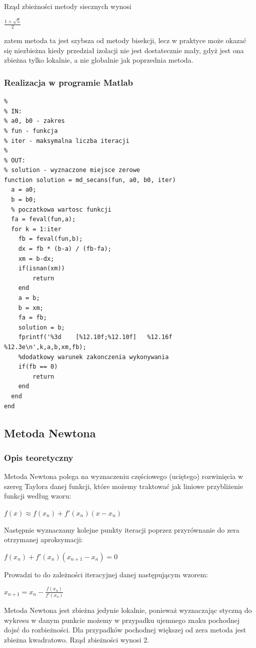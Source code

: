 \documentclass[11pt, oneside]{article}   	%
\begin{document}
Rząd zbieżności metody siecznych wynosi \begin{large}$\frac{1+\sqrt{5}}{2}$\end{large} zatem metoda ta jest szybsza od metody bisekcji, lecz w praktyce może okazać się niezbieżna kiedy przedział izolacji nie jest dostatecznie mały, gdyż jest ona zbieżna tylko lokalnie, a nie globalnie jak poprzednia metoda. 
\subsubsection{Realizacja w programie Matlab}
\begin{lstlisting}[caption=Implementacja metody siecznych]
% Funkcja wyznaczajaca punkty zerowe funkcji metoda siecznych
%
% IN:
% a0, b0 - zakres
% fun - funkcja 
% iter - maksymalna liczba iteracji
%
% OUT:
% solution - wyznaczone miejsce zerowe
function solution = md_secans(fun, a0, b0, iter)
  a = a0;
  b = b0;
  % poczatkowa wartosc funkcji
  fa = feval(fun,a); 
  for k = 1:iter
    fb = feval(fun,b);
    dx = fb * (b-a) / (fb-fa); 
    xm = b-dx; 
    if(isnan(xm))
        return
    end
    a = b;
    b = xm;
    fa = fb;
    solution = b;
    fprintf('%3d	[%12.10f;%12.10f]   %12.16f     %12.3e\n',k,a,b,xm,fb);
    %dodatkowy warunek zakonczenia wykonywania
    if(fb == 0) 
        return
    end
  end
end
\end{lstlisting}

\subsection{Metoda Newtona}
\subsubsection{Opis teoretyczny}
Metoda Newtona polega na wyznaczeniu częściowego (uciętego) rozwinięcia w szereg Taylora danej funkcji, które możemy traktować jak liniowe przybliżenie funkcji według wzoru:\
  	\begin{center}
  	$f(x) \approx f(x_{n})+f'(x_{n})(x-x_{n})$
	\end{center}
Następnie wyznaczamy kolejne punkty iteracji poprzez przyrównanie do zera otrzymanej aproksymacji:\\
\begin{center}
$f(x_{n})+f'(x_{n})(x_{n+1}-x_{n}) = 0$
\end{center}
Prowadzi to do zależności iteracyjnej danej następującym wzorem:\\
\begin{center}
$x_{n+1} = x_{n}-\frac{f(x_{n})}{f'(x_{n})}$
\end{center}
Metoda Newtona jest zbieżna jedynie lokalnie, ponieważ wyznaczając styczną do wykresu w danym punkcie możemy w przypadku ujemnego znaku pochodnej dojsć do rozbieżności. Dla przypadków pochodnej większej od zera metoda jest zbieżna kwadratowo. Rząd zbieżności wynosi 2.
\end{document}

